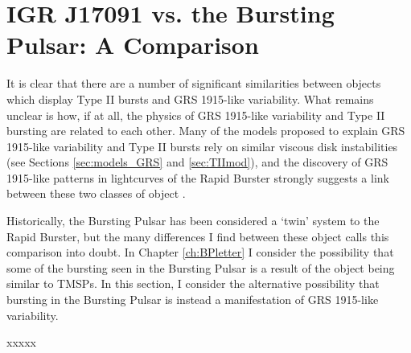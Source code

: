 \section{IGR J17091 vs. the Bursting Pulsar: A Comparison}

\par It is clear that there are a number of significant similarities between objects which display Type II bursts and GRS 1915-like variability.  What remains unclear is how, if at all, the physics of GRS 1915-like variability and Type II bursting are related to each other.  Many of the models proposed to explain GRS 1915-like variability and Type II bursts rely on similar viscous disk instabilities (see Sections \ref{sec:models_GRS} and \ref{sec:TIImod}), and the discovery of GRS 1915-like patterns in lightcurves of the Rapid Burster strongly suggests a link between these two classes of object \citep{Bagnoli_RB}.
\par Historically, the Bursting Pulsar has been considered a `twin' system to the Rapid Burster, but the many differences I find between these object calls this comparison into doubt.  In Chapter \ref{ch:BPletter} I consider the possibility that some of the bursting seen in the Bursting Pulsar is a result of the object being similar to TMSPs.  In this section, I consider the alternative possibility that bursting in the Bursting Pulsar is instead a manifestation of GRS 1915-like variability.
\par xxxxx
